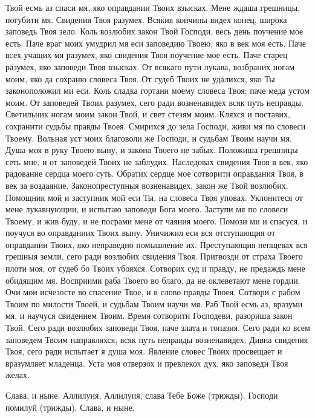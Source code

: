 Твой есмь аз спаси мя, яко оправдании Твоих взысках. Мене ждаша грешницы, погубити мя. Свидения Твоя разумех. Всякия кончины видех конец, широка заповедь Твоя зело. Коль возлюбих закон Твой Господи, весь день поучение мое есть. Паче враг моих умудрил мя еси заповедию Твоею, яко в век моя есть. Паче всех учащих мя разумех, яко свидения Твоя поучение мое есть. Паче старец разумех, яко заповеди Твоя взысках. От всякаго пути лукава, возбраних ногам моим, яко да сохраню словеса Твоя. От судеб Твоих не удалихся, яко Ты законоположил ми еси. Коль сладка гортани моему словеса Твоя; паче меда устом моим. От заповедей Твоих разумех, сего ради возненавидех всяк путь неправды. Светильник ногам моим закон Твой, и свет стезям моим. Кляхся и поставих, сохранити судьбы правды Твоея. Смирихся до зела Господи, живи мя по словеси Твоему. Вольная уст моих благоволи же Господи, и судьбам Твоим научи мя. Душа моя в руку Твоею выну, и закона Твоего не забых. Положиша грешницы сеть мне, и от заповедей Твоих не заблудих. Наследовах свидения Твоя в век, яко радование сердца моего суть. Обратих сердце мое сотворити оправдания Твоя, в век за воздаяние. Законопреступныя возненавидех, закон же Твой возлюбих. Помощник мой и заступник мой еси Ты, на словеса Твоя уповах. Уклонитеся от мене лукавнующии, и испытаю заповеди Бога моего. Заступи мя по словеси Твоему, и жив буду, и не посрами мене от чаяния моего. Помози ми и спасуся, и поучуся во оправданиих Твоих выну. Уничижил еси вся отступающия от оправдании Твоих, яко неправедно помышление их. Преступающия непщевах вся грешныя земли, сего ради возлюбих свидения Твоя. Пригвозди от страха Твоего плоти моя, от судеб бо Твоих убояхся. Сотворих суд и правду, не предаждь мене обидящим мя. Восприими раба Твоего во благо, да не оклеветают мене гордии. Очи мои исчезосте во спасение Твое, и в слово правды Твоея. Сотвори с рабом Твоим по милости Твоей, и судьбам Твоим научи мя. Раб Твой есмь аз, вразуми мя, и научуся свидением Твоим. Время сотворити Господеви, разориша закон Твой. Сего ради возлюбих заповеди Твоя, паче злата и топазия. Сего ради ко всем заповедем Твоим направляхся, всяк путь неправды возненавидех. Дивна свидения Твоя, сего ради испытает я душа моя. Явление словес Твоих просвещает и вразумляет младенца. Уста моя отверзох и превлекох дух, яко заповеди Твоя желах. 

Слава, и ныне. Аллилуия, Аллилуия, слава Тебе Боже (трижды). Господи помилуй (трижды). Слава, и ныне.


